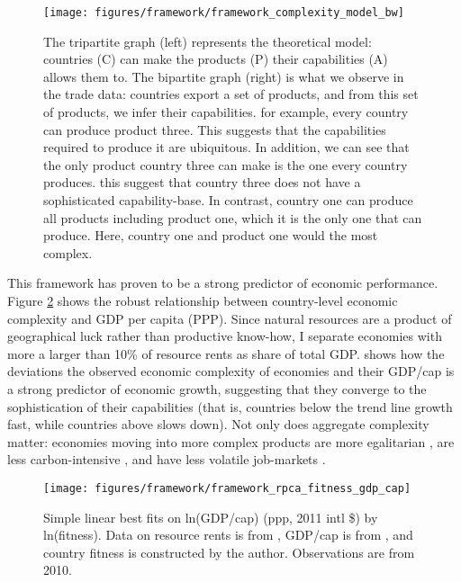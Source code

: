 \documentclass[11pt]{article}
\begin{document}
\begin{figure}[htpb]
  \centering
  \texttt{[image: figures/framework/framework\_complexity\_model\_bw]}
	\caption{The tripartite graph (left) represents the theoretical model: countries (C) can make the products (P) their capabilities (A) allows them to. The bipartite graph (right) is what we observe in the trade data: countries export a set of products, and from this set of products, we infer their capabilities. for example, every country can produce product three. This suggests that the capabilities required to produce it are ubiquitous. In addition, we can see that the only product country three can make is the one every country produces. this suggest that country three does not have a sophisticated capability-base. In contrast, country one can produce all products including product one, which it is the only one that can produce. Here, country one and product one would the most complex.}
	\label{fig:complexity-model}
\end{figure}

This framework has proven to be a strong predictor of economic performance. Figure \ref{fig:framework-eci-gdp} shows the robust relationship between country-level economic complexity and GDP per capita (PPP). Since natural resources are a product of geographical luck rather than productive know-how, I separate economies with more a larger than 10\% of resource rents as share of total GDP. \cite{hausmann_atlas_2013} shows how the deviations the observed economic complexity of economies and their GDP/cap is a strong predictor of economic growth, suggesting that they converge to the sophistication of their capabilities (that is, countries below the trend line growth fast, while countries above slows down). Not only does aggregate complexity matter: economies moving into more complex products are more egalitarian \citep{hartmann_linking_2017-1}, are less carbon-intensive \citep{can_impact_2017}, and have less volatile job-markets \citep{adam_economic_2019}.

\begin{figure}[htpb]
	\centering
	\texttt{[image: figures/framework/framework\_rpca\_fitness\_gdp\_cap]}
	\caption{Simple linear best fits on ln(GDP/cap) (ppp, 2011 intl \$) by ln(fitness). Data on resource rents is from \cite{world_bank_world_2020}, GDP/cap is from \cite{world_bank_world_2020-1}, and country fitness is constructed by the author. Observations are from 2010.}
	\label{fig:framework-eci-gdp}
\end{figure}
\end{document}

